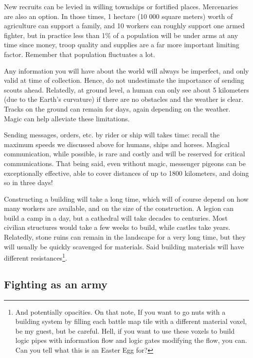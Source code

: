 New recruits can be levied in willing townships or fortified places. Mercenaries are also an option. In those times, 1 hectare (10 000 square meters) worth of agriculture can support a family, and 10 workers can roughly support one armed fighter, but in practice less than 1\% of a population will be under arms at any time since money, troop quality and supplies are a far more important limiting factor. Remember that population fluctuates a lot.

Any information you will have about the world will always be imperfect, and only valid at time of collection. Hence, do not undestimate the importance of sending scouts ahead. Relatedly, at ground level, a human can only see about 5 kilometers (due to the Earth's curvature) if there are no obstacles and the weather is clear. Tracks on the ground can remain for days, again depending on the weather. Magic can help alleviate these limitations. 

Sending messages, orders, etc. by rider or ship will takes time: recall the maximum speeds we discussed above for humans, ships and horses. Magical communication, while possible, is rare and costly and will be reserved for critical communications. That being said, even without magic, messenger pigeons can be exceptionally effective, able to cover distances of up to 1800 kilometers, and doing so in three days!

Constructing a building will take a long time, which will of course depend on how many workers are available, and on the size of the construction. A legion can build a camp in a day, but a cathedral will take decades to centuries. Most civilian structures would take a few weeks to build, while castles take years. Relatedly, stone ruins can remain in the landscape for a very long time, but they will usually be quickly scavenged for materials. Said building materials will have different resistances\footnote{And potentially opacities. On that note, If you want to go nuts with a building system by filling each battle map tile with a different material voxel, be my guest, but be careful. Hell, if you want to use these voxels to build logic pipes with information flow and logic gates modifying the flow, you can. Can you tell what this is an Easter Egg for?}.



\subsection{Fighting as an army}

